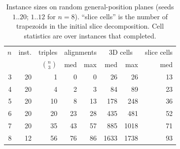 \begin{table}[htbp]
\centering
\begin{tabular}{rrrrrrrr}
\toprule
$n$ & inst. & triples & \multicolumn{2}{c}{alignments} & \multicolumn{2}{c}{3D cells} & slice cells \\
& & $\binom{n}{3}$ & med & max & med & max & med \\
\midrule
3 & 20 & 1 & 0 & 0 & 26 & 26 & 13 \\
4 & 20 & 4 & 2 & 3 & 84 & 89 & 23 \\
5 & 20 & 10 & 8 & 13 & 178 & 248 & 36 \\
6 & 20 & 20 & 23 & 28 & 435 & 481 & 52 \\
7 & 20 & 35 & 43 & 57 & 885 & 1018 & 71 \\
8 & 12 & 56 & 76 & 86 & 1633 & 1738 & 93 \\
\bottomrule
\end{tabular}
\caption{Instance sizes on random general-position planes (seeds $1..20$; $1..12$ for $n=8$). ``slice cells'' is the number of trapezoids in the initial slice decomposition. Cell statistics are over instances that completed.}
\label{tab:combinatorics}
\end{table}
